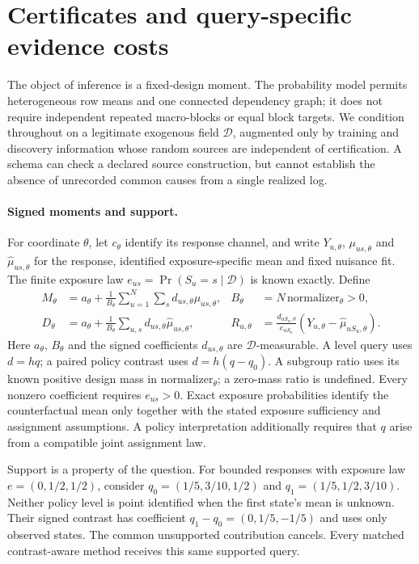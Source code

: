 \section{Certificates and query-specific evidence costs}
\label{sec:post-cstat-theory}

The object of inference is a fixed-design moment. The probability model permits
heterogeneous row means and one connected dependency graph; it does not require
independent repeated macro-blocks or equal block targets. We condition throughout
on a legitimate exogenous field $\mathcal D$, augmented only by training and
discovery information whose random sources are independent of certification.
A schema can check a declared source construction, but cannot establish the
absence of unrecorded common causes from a single realized log.

\paragraph{Signed moments and support.}
For coordinate $\theta$, let $c_\theta$ identify its response channel, and write
$Y_{u,\theta}$, $\mu_{us,\theta}$ and $\widehat\mu_{us,\theta}$ for the response,
identified exposure-specific mean and fixed nuisance fit. The finite exposure
law $e_{us}=\Pr(S_u=s\mid\mathcal D)$ is known exactly. Define
\begin{align}
 M_\theta
 &=a_\theta+\frac{1}{B_\theta}
     \sum_{u=1}^N\sum_s d_{us,\theta}\mu_{us,\theta},
 &B_\theta&=N\,\mathrm{normalizer}_\theta>0,
 \label{eq:post-target}\\
 D_\theta
 &=a_\theta+\frac{1}{B_\theta}
     \sum_{u,s}d_{us,\theta}\widehat\mu_{us,\theta},
 &R_{u,\theta}
 &=\frac{d_{uS_u,\theta}}{e_{uS_u}}
       (Y_{u,\theta}-\widehat\mu_{uS_u,\theta}).
 \label{eq:post-residual}
\end{align}
Here $a_\theta$, $B_\theta$ and the signed coefficients $d_{us,\theta}$ are
$\mathcal D$-measurable. A level query uses $d=hq$; a paired policy contrast
uses $d=h(q-q_0)$. A subgroup ratio uses its known positive design mass in
$\mathrm{normalizer}_\theta$; a zero-mass ratio is undefined. Every nonzero
coefficient requires $e_{us}>0$. Exact exposure probabilities identify the
counterfactual mean only together with the stated exposure sufficiency and
assignment assumptions. A policy interpretation additionally requires that
$q$ arise from a compatible joint assignment law.

Support is a property of the question. For bounded responses with exposure
law $e=(0,1/2,1/2)$, consider
$q_0=(1/5,3/10,1/2)$ and $q_1=(1/5,1/2,3/10)$.
Neither policy level is point identified when the first state's mean is
unknown. Their signed contrast has coefficient
$q_1-q_0=(0,1/5,-1/5)$ and uses only observed states. The common unsupported
contribution cancels. Every matched contrast-aware method receives this
same supported query.

